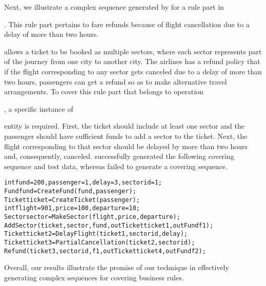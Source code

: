 Next, we illustrate a complex sequence generated by \tool{} for a rule part in
\subject{Cebu-pacific}. This rule part pertains to fare refunds because of
flight cancellation due to a delay of more than two
hours. \subject{Cebu-pacific} allows a ticket to be booked as multiple sectors,
where each sector represents part of the journey from one city to another
city. The airlines has a refund policy that if the flight corresponding to any
sector gets canceled due to a delay of more than two hours, passengers can get a
refund so as to make alternative travel arrangements. To cover this rule part
that belongs to operation \subject{Refund}, a specific instance of
\subject{Ticket} entity is required. First, the ticket should include at least
one sector and the passenger should have sufficient funds to add a sector to the
ticket. Next, the flight corresponding to that sector should be delayed by more
than two hours and, consequently, canceled. \tool{} successfully generated the
following covering sequence and test data, whereas \exhaust{} failed to generate
a covering sequence.

{\scriptsize
\begin{alltt}
 int fund = 200, passenger = 1, delay = 3, sectorid = 1;
 Fund fund = CreateFund(fund, passenger);
 Ticket ticket = CreateTicket(passenger);
 int flight = 901, price = 100, departure = 10; 
 Sector sector = MakeSector(flight, price, departure);
 AddSector(ticket, sector, fund, out Ticket ticket1, out Fund f1); 
 Ticket ticket2 = DelayFlight(ticket1, sectorid, delay);
 Ticket ticket3 = PartialCancellation(ticket2, sectorid);
 Refund(ticket3, sectorid, f1, out Ticket ticket4, out Fund f2);
\end{alltt}
}

Overall, our results illustrate the promise of our technique in effectively
generating complex sequences for covering business rules.

